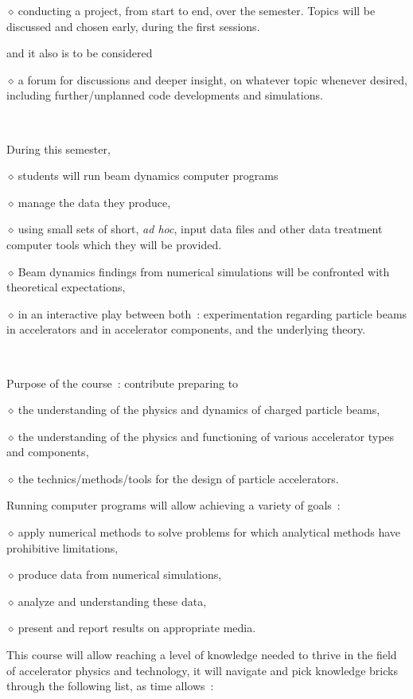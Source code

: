 \documentclass[12pt]{article}
\newcommand{\sid}{{\small \ensuremath{\diamond~}}}
\begin{document}
\sid conducting a project, from start to end, over the semester. Topics will be discussed and chosen early, 
during the first sessions. 

and it also is to be considered

\sid a forum for discussions and deeper insight, on whatever topic whenever desired, 
including further/unplanned code developments and simulations. 


~

During this semester, 

\sid students will run beam dynamics computer programs 

\sid manage the data they produce, 

\sid using  small sets of short, \textsl{ad hoc}, 
input data files and other data treatment computer tools which they will be provided. 

\sid Beam dynamics findings from numerical simulations will be confronted with theoretical expectations,  

\sid in an interactive play between both~: experimentation regarding particle beams in accelerators and in accelerator 
components, and the underlying theory.

~

Purpose of the course~:  contribute preparing to 

\sid   the understanding of the physics and dynamics of charged particle beams, 

\sid  the understanding of the physics and functioning of various  accelerator types and components, 

\sid  the technics/methods/tools for the design of  particle accelerators. 

\bigskip

Running computer programs will allow achieving  a variety of goals~: 

\sid apply numerical methods to solve problems for which  analytical methods have prohibitive limitations, 

\sid produce  data from  numerical simulations, 

\sid analyze and understanding these data, 
 
\sid present and report results on appropriate media. 


\bigskip

This course will allow  reaching a level of  knowledge needed to thrive in the field of accelerator physics and technology, 
it will navigate and pick knowledge bricks through the following list, as time allows~: 
\end{document}

